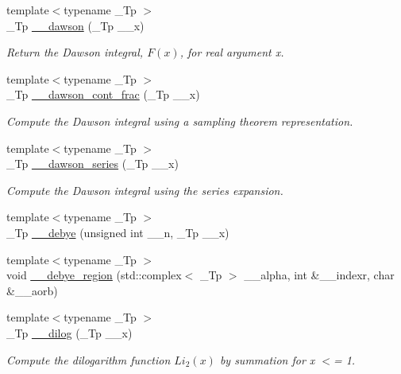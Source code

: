 \begin{DoxyCompactItemize}
{\footnotesize template$<$typename \+\_\+\+Tp $>$ }\\\+\_\+\+Tp \hyperlink{namespacestd_1_1____detail_a6384fb4c5af31b41a38c120869a548c7}{\+\_\+\+\_\+dawson} (\+\_\+\+Tp \+\_\+\+\_\+x)
\begin{DoxyCompactList}\small\item\em Return the Dawson integral, $ F(x) $, for real argument {\ttfamily x}. \end{DoxyCompactList}\item 
{\footnotesize template$<$typename \+\_\+\+Tp $>$ }\\\+\_\+\+Tp \hyperlink{namespacestd_1_1____detail_a3ad3b7b4dcebdf69778dbf7a5ba2427c}{\+\_\+\+\_\+dawson\+\_\+cont\+\_\+frac} (\+\_\+\+Tp \+\_\+\+\_\+x)
\begin{DoxyCompactList}\small\item\em Compute the Dawson integral using a sampling theorem representation. \end{DoxyCompactList}\item 
{\footnotesize template$<$typename \+\_\+\+Tp $>$ }\\\+\_\+\+Tp \hyperlink{namespacestd_1_1____detail_a033d91cc1c67280385ff3d1d809a21d1}{\+\_\+\+\_\+dawson\+\_\+series} (\+\_\+\+Tp \+\_\+\+\_\+x)
\begin{DoxyCompactList}\small\item\em Compute the Dawson integral using the series expansion. \end{DoxyCompactList}\item 
{\footnotesize template$<$typename \+\_\+\+Tp $>$ }\\\+\_\+\+Tp \hyperlink{namespacestd_1_1____detail_a26d3f285cfbcaba6fa30d3e4164c6187}{\+\_\+\+\_\+debye} (unsigned int \+\_\+\+\_\+n, \+\_\+\+Tp \+\_\+\+\_\+x)
\item 
{\footnotesize template$<$typename \+\_\+\+Tp $>$ }\\void \hyperlink{namespacestd_1_1____detail_a3212c0a136417e862f2ed8e9684e053c}{\+\_\+\+\_\+debye\+\_\+region} (std\+::complex$<$ \+\_\+\+Tp $>$ \+\_\+\+\_\+alpha, int \&\+\_\+\+\_\+indexr, char \&\+\_\+\+\_\+aorb)
\item 
{\footnotesize template$<$typename \+\_\+\+Tp $>$ }\\\+\_\+\+Tp \hyperlink{namespacestd_1_1____detail_a5083a0c9fce3299593ca22e7dbaeaf19}{\+\_\+\+\_\+dilog} (\+\_\+\+Tp \+\_\+\+\_\+x)
\begin{DoxyCompactList}\small\item\em Compute the dilogarithm function $ Li_2(x) $ by summation for x $<$= 1. \end{DoxyCompactList}\item 

\end{DoxyCompactItemize}
